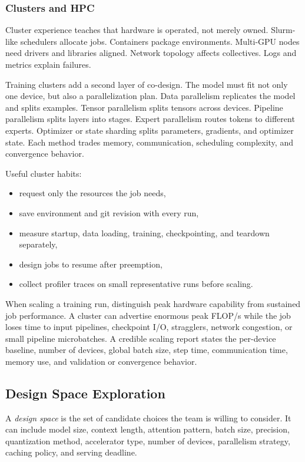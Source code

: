 \subsubsection{Clusters and HPC}

Cluster experience teaches that hardware is operated, not merely owned. Slurm-like schedulers allocate jobs. Containers package environments. Multi-GPU nodes need drivers and libraries aligned. Network topology affects collectives. Logs and metrics explain failures.

Training clusters add a second layer of co-design. The model must fit not only one device, but also a parallelization plan. Data parallelism replicates the model and splits examples. Tensor parallelism splits tensors across devices. Pipeline parallelism splits layers into stages. Expert parallelism routes tokens to different experts. Optimizer or state sharding splits parameters, gradients, and optimizer state. Each method trades memory, communication, scheduling complexity, and convergence behavior.

Useful cluster habits:

\begin{itemize}[leftmargin=*]
  \item request only the resources the job needs,
  \item save environment and git revision with every run,
  \item measure startup, data loading, training, checkpointing, and teardown separately,
  \item design jobs to resume after preemption,
  \item collect profiler traces on small representative runs before scaling.
\end{itemize}

When scaling a training run, distinguish peak hardware capability from sustained job performance. A cluster can advertise enormous peak FLOP/s while the job loses time to input pipelines, checkpoint I/O, stragglers, network congestion, or small pipeline microbatches. A credible scaling report states the per-device baseline, number of devices, global batch size, step time, communication time, memory use, and validation or convergence behavior.

\subsection{Design Space Exploration}

A \emph{design space} is the set of candidate choices the team is willing to consider. It can include model size, context length, attention pattern, batch size, precision, quantization method, accelerator type, number of devices, parallelism strategy, caching policy, and serving deadline.

